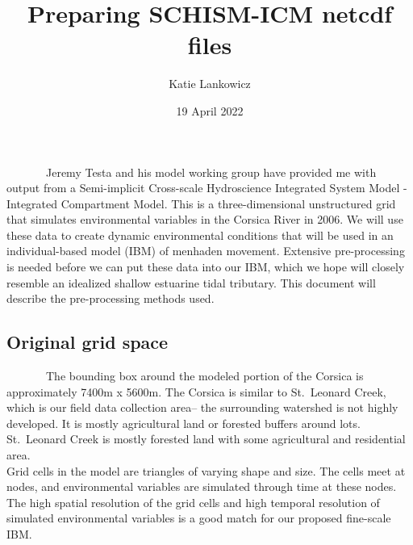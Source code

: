 \documentclass[
]{article}
\title{Preparing SCHISM-ICM netcdf files}
\author{Katie Lankowicz}
\date{19 April 2022}
\begin{document}
\maketitle

~~~~~~~Jeremy Testa and his model working group have provided me with
output from a Semi-implicit Cross-scale Hydroscience Integrated System
Model - Integrated Compartment Model. This is a three-dimensional
unstructured grid that simulates environmental variables in the Corsica
River in 2006. We will use these data to create dynamic environmental
conditions that will be used in an individual-based model (IBM) of
menhaden movement. Extensive pre-processing is needed before we can put
these data into our IBM, which we hope will closely resemble an
idealized shallow estuarine tidal tributary. This document will describe
the pre-processing methods used.

\hypertarget{original-grid-space}{%
\subsection{Original grid space}\label{original-grid-space}}

~~~~~~~The bounding box around the modeled portion of the Corsica is
approximately 7400m x 5600m. The Corsica is similar to St.~Leonard
Creek, which is our field data collection area-- the surrounding
watershed is not highly developed. It is mostly agricultural land or
forested buffers around lots. St.~Leonard Creek is mostly forested land
with some agricultural and residential area.\\
\hspace*{0.333em}\hspace*{0.333em}\hspace*{0.333em}\hspace*{0.333em}\hspace*{0.333em}\hspace*{0.333em}\hspace*{0.333em}Grid
cells in the model are triangles of varying shape and size. The cells
meet at nodes, and environmental variables are simulated through time at
these nodes. The high spatial resolution of the grid cells and high
temporal resolution of simulated environmental variables is a good match
for our proposed fine-scale IBM.

\singlespacing
\end{document}
